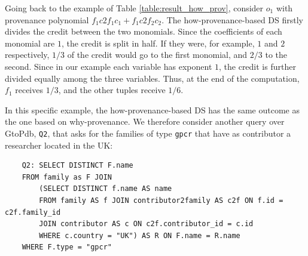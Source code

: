 
Going back to the example of Table \ref{table:result_how_prov}, consider $o_1$ with provenance polynomial $f_1 c2f_1 c_1 + f_1 c2f_2 c_2$. The how-provenance-based DS firstly divides the credit between the two monomials. Since the coefficients of each monomial are $1$, the credit is split in half. If they were, for example, $1$ and $2$ respectively, $1/3$ of the credit would go to the first monomial, and $2/3$ to the second.  
Since in our example each variable has exponent $1$, the credit is further divided equally among the three variables. Thus, at the end of the computation, $f_1$ receives $1/3$, and the other tuples receive $1/6$.



In this specific example, the how-provenance-based DS has the same outcome as the one based on why-provenance. %
We therefore consider another query over GtoPdb, \texttt{Q2}, that asks for the families of type \texttt{gpcr} that have as contributor a researcher located in the UK:

\vspace{2mm}
{\footnotesize
\begin{adjustwidth}{25pt}{5pt}
\begin{verbatim}
	Q2: SELECT DISTINCT F.name 
	FROM family as F JOIN
		(SELECT DISTINCT f.name AS name
		FROM family AS f JOIN contributor2family AS c2f ON f.id = c2f.family_id
		JOIN contributor AS c ON c2f.contributor_id = c.id
		WHERE c.country = "UK") AS R ON F.name = R.name
	WHERE F.type = "gpcr"
\end{verbatim}	
\end{adjustwidth}
}
\vspace{2mm}

